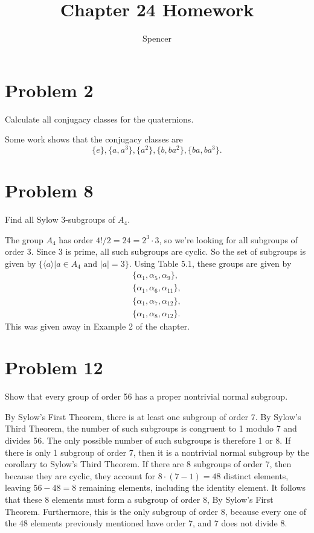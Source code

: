 \documentclass{article}
\title{Chapter 24 Homework}
\author{Spencer}
\begin{document}
\maketitle

\newcommand{\Z}{\mathbb{Z}}
\newcommand{\R}{\mathbb{R}}
\newcommand{\N}{\mathbb{N}}
\newcommand{\Q}{\mathbb{Q}}
\newcommand{\cl}{\mbox{cl}}

\section*{Problem 2}

Calculate all conjugacy classes for the quaternions.

Some work shows that the conjugacy classes are
\begin{equation*}
\{e\},\{a,a^3\},\{a^2\},\{b,ba^2\},\{ba,ba^3\}.
\end{equation*}

\section*{Problem 8}

Find all Sylow 3-subgroups of $A_4$.

The group $A_4$ has order $4!/2=24=2^3\cdot 3$, so we're looking for
all subgroups of order 3.  Since 3 is prime, all such subgroups are cyclic.
So the set of subgroups is given by
$\{\langle a\rangle|\mbox{$a\in A_4$ and $|a|=3$}\}$.
Using Table 5.1, these groups are given by
\begin{align*}
\{\alpha_1,\alpha_5,\alpha_9\},\\
\{\alpha_1,\alpha_6,\alpha_{11}\},\\
\{\alpha_1,\alpha_7,\alpha_{12}\},\\
\{\alpha_1,\alpha_8,\alpha_{12}\}.
\end{align*}
This was given away in Example 2 of the chapter.

\section*{Problem 12}

Show that every group of order 56 has a proper nontrivial normal subgroup.

By Sylow's First Theorem, there is at least one subgroup of order 7.
By Sylow's Third Theorem, the number of such subgroups is congruent
to 1 modulo 7 and divides 56.  The only possible number of such
subgroups is therefore 1 or 8.  If there is only 1 subgroup of order 7,
then it is a nontrivial normal subgroup by the corollary to Sylow's
Third Theorem.  If there are 8 subgroups of order 7, then because
they are cyclic, they account for $8\cdot(7-1)=48$ distinct elements,
leaving $56-48=8$ remaining elements, including the identity element.
It follows that these 8 elements must form a subgroup of order 8,
By Sylow's First Theorem.
Furthermore, this is the only subgroup of order 8, because every
one of the 48 elements previously mentioned have order 7, and 7 does
not divide 8.
\end{document}
